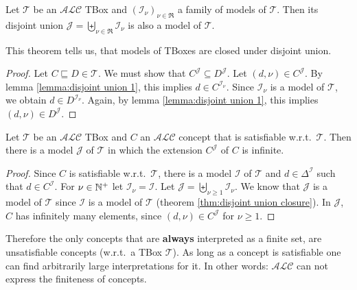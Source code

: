 \begin{theorem}\label{thm:disjoint union closure}
	Let $\mathcal{T}$ be an $\mathcal{ALC}$ TBox and $(\mathcal{I}_\nu)_{\nu \in \mathfrak{R}}$ a family of models of $\mathcal{T}$.
	Then its disjoint union $\mathcal{J} = \biguplus_{\nu \in \mathfrak{R}} \mathcal{I}_\nu$ is also a model of $\mathcal{T}$.
\end{theorem}
This theorem tells us, that models of TBoxes are closed under disjoint union.
\begin{proof}
	Let $C \sqsubseteq D \in \mathcal{T}$.
	We must show that $C^{\mathcal{J}} \subseteq D^{\mathcal{J}}$.
	Let $\left( d,\nu \right) \in C^{\mathcal{J}}$.
	By lemma \ref{lemma:disjoint union 1}, this implies $d \in C^{\mathcal{I}_\nu}$.
	Since $\mathcal{I}_\nu$ is a model of $\mathcal{T}$, we obtain $d \in D^{\mathcal{I}_\nu}$.
	Again, by lemma \ref{lemma:disjoint union 1}, this implies $(d,\nu) \in D^{\mathcal{J}}$.
\end{proof}

\begin{corollary}
 	Let $\mathcal{T}$ be an $\mathcal{ALC}$ TBox and $C$ an $\mathcal{ALC}$ concept that is satisfiable w.r.t.\ $\mathcal{T}$.
	Then there is a model $\mathcal{J}$ of $\mathcal{T}$ in which the extension $C^{\mathcal{J}}$ of $C$ is infinite.
\end{corollary}
\begin{proof}
	Since $C$ is satisfiable w.r.t.\ $\mathcal{T}$, there is a model $\mathcal{I}$ of $\mathcal{T}$ and $d \in \Delta^{\mathcal{I}}$ such that $d \in C^{\mathcal{I}}$.
	For $\nu \in \mathbb{N}^{+}$ let $\mathcal{I}_\nu = \mathcal{I}$.
	Let $\mathcal{J} = \biguplus_{\nu \geq 1} \mathcal{I}_\nu$.
	We know that $\mathcal{J}$ is a model of $\mathcal{T}$ since $\mathcal{I}$ is a model of $\mathcal{T}$ (theorem \ref{thm:disjoint union closure}).
	In $\mathcal{J}$, $C$ has infinitely many elements, since $(d,\nu) \in C^{\mathcal{J}}$ for $\nu \geq 1$.
\end{proof}
Therefore the only concepts that are \textbf{always} interpreted as a finite set,
are unsatisfiable concepts (w.r.t.\ a TBox $\mathcal{T}$).
As long as a concept is satisfiable one can find arbitrarily large interpretations for it.
In other words: $\mathcal{ALC}$ can not express the finiteness of concepts.

\newpage
